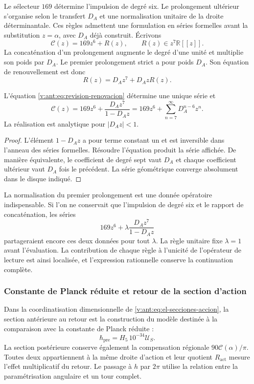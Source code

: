 Le sélecteur \(169\) détermine l'impulsion de degré six. Le prolongement
ultérieur s'organise selon le transfert \(D_A\) et une normalisation
unitaire de la droite déterminantale. Ces règles admettent une formulation
en séries formelles avant la substitution \(z=\alpha\), avec \(D_A\) déjà
construit. Écrivons
\[
 \mathscr C(z)=169z^6+R(z),\qquad R(z)\in z^7\mathbb R[[z]].
\]
La concaténation d'un prolongement augmente le degré d'une unité et
multiplie son poids par \(D_A\). Le premier prolongement strict a pour
poids \(D_A\). Son équation de renouvellement est donc
\begin{equation}
 R(z)=D_Az^7+D_AzR(z).
 \label{v:ant:eq:revision-renovacion}
\end{equation}

\begin{proposition}
L'équation \eqref{v:ant:eq:revision-renovacion} détermine une unique série et
\[
 \mathscr C(z)=169z^6+\frac{D_Az^7}{1-D_Az}
             =169z^6+\sum_{n=7}^{\infty}D_A^{n-6}z^n.
\]
La réalisation est analytique pour \(|D_Az|<1\).
\end{proposition}
\begin{proof}
L'élément \(1-D_Az\) a pour terme constant un et est inversible
dans l'anneau des séries formelles. Résoudre l'équation produit la série
affichée. De manière équivalente, le coefficient de degré sept vaut \(D_A\)
et chaque coefficient ultérieur vaut \(D_A\) fois le précédent. La série
géométrique converge absolument dans le disque indiqué.
\end{proof}

La normalisation du premier prolongement est une donnée opératoire
indispensable. Si l'on ne conservait que l'impulsion de degré six et
le rapport de concaténation, les séries
\[
 169z^6+\lambda\frac{D_Az^7}{1-D_Az}
\]
partageraient encore ces deux données pour tout \(\lambda\).
La règle unitaire fixe \(\lambda=1\) avant l'évaluation.
La contribution de chaque règle à l'unicité de l'opérateur de lecture
est ainsi localisée, et l'expression rationnelle conserve la continuation complète.

\subsubsection{Constante de Planck réduite et retour de la section d'action}

Dans la coordinatisation dimensionnelle de \eqref{v:ant:eq:el-secciones-accion}, la section
antérieure au retour est la construction du modèle destinée à la comparaison
avec la constante de Planck réduite :
\[
 \hbar_{\mathrm{pre}}=H_5\,10^{-34}\mathcal U_S.
\]
La section postérieure conserve également la compensation régionale
\(90\mathscr C(\alpha)/\pi\). Toutes deux appartiennent à la même droite
d'action et leur quotient \(R_{\mathrm{act}}\) mesure l'effet multiplicatif
du retour. Le passage à \(h\) par \(2\pi\) utilise la relation
entre la paramétrisation angulaire et un tour complet.
